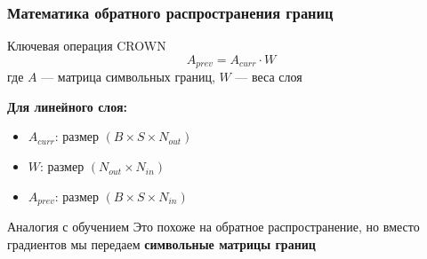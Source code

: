 \begin{frame}
\frametitle{Математика обратного распространения границ}

\begin{block}{Ключевая операция CROWN}
$$A_{prev} = A_{curr} \cdot W$$
где $A$ --- матрица символьных границ, $W$ --- веса слоя
\end{block}

\vspace{0.3cm}

\textbf{Для линейного слоя:}
\begin{itemize}
    \item $A_{curr}$: размер $(B \times S \times N_{out})$
    \item $W$: размер $(N_{out} \times N_{in})$
    \item $A_{prev}$: размер $(B \times S \times N_{in})$
\end{itemize}

\vspace{0.3cm}

\begin{exampleblock}{Аналогия с обучением}
Это похоже на обратное распространение, но вместо градиентов мы передаем \textbf{символьные матрицы границ}
\end{exampleblock}

\end{frame}
